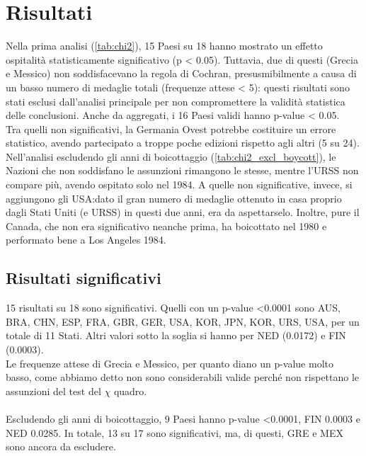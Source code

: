 \section{Risultati}\label{sec:results}


Nella prima analisi (\cref{tab:chi2}), 15 Paesi su 18 hanno mostrato un effetto
ospitalità statisticamente significativo (p < 0.05). Tuttavia, due di questi
(Grecia e Messico) non soddisfacevano la regola di Cochran, presusmibilmente a
causa di un basso numero di medaglie totali (frequenze attese < 5): questi
risultati sono stati esclusi dall'analisi principale per non compromettere la
validità statistica delle conclusioni. Anche da aggregati, i 16 Paesi validi
hanno p-value < 0.05.\\
Tra quelli non significativi, la Germania Ovest potrebbe costituire un errore
statistico, avendo partecipato a troppe poche edizioni rispetto agli altri (5 su
24). \\
Nell'analisi escludendo gli anni di boicottaggio (\cref{tab:chi2_excl_boycott}),
le Nazioni che non soddisfano le assunzioni rimangono le stesse, mentre l'URSS
non compare più, avendo ospitato solo nel 1984. A quelle non significative,
invece, si aggiungono gli USA:\@ dato il gran numero di medaglie ottenuto in
casa proprio dagli Stati Uniti (e URSS) in questi due anni, era da aspettarselo.
Inoltre, pure il Canada, che non era significativo neanche prima, ha boicottato
nel 1980 e performato bene a Los Angeles 1984.






\subsection{Risultati significativi}

15 risultati su 18 sono significativi. Quelli con un p-value <0.0001 sono AUS,
BRA, CHN, ESP, FRA, GBR, GER, USA, KOR, JPN, KOR, URS, USA, per un totale di 11
Stati. Altri valori sotto la soglia si hanno per NED (0.0172) e FIN (0.0003).\\
Le frequenze attese di Grecia e Messico, per quanto diano un p-value molto
basso, come abbiamo detto non sono considerabili valide perché non rispettano le
assunzioni del test del $\chi$ quadro.\\
\\
Escludendo gli anni di boicottaggio, 9 Paesi hanno p-value <0.0001, FIN 0.0003 e
NED 0.0285. In totale, 13 su 17 sono significativi, ma, di questi, GRE e MEX
sono ancora da escludere.


